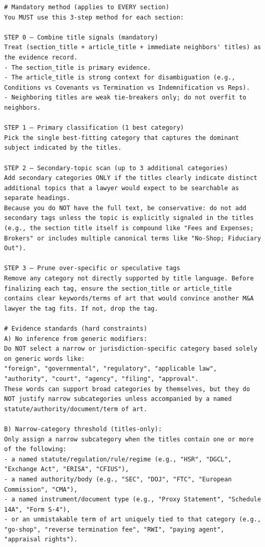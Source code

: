 \documentclass[12pt]{article}
\begin{document}
{\begin{appendices}
\begin{verbatim}
# Mandatory method (applies to EVERY section)
You MUST use this 3-step method for each section:

STEP 0 — Combine title signals (mandatory)
Treat (section_title + article_title + immediate neighbors' titles) as the evidence record.
- The section_title is primary evidence.
- The article_title is strong context for disambiguation (e.g., Conditions vs Covenants vs Termination vs Indemnification vs Reps).
- Neighboring titles are weak tie-breakers only; do not overfit to neighbors.

STEP 1 — Primary classification (1 best category)
Pick the single best-fitting category that captures the dominant subject indicated by the titles.

STEP 2 — Secondary-topic scan (up to 3 additional categories)
Add secondary categories ONLY if the titles clearly indicate distinct additional topics that a lawyer would expect to be searchable as separate headings.
Because you do NOT have the full text, be conservative: do not add secondary tags unless the topic is explicitly signaled in the titles
(e.g., the section title itself is compound like "Fees and Expenses; Brokers" or includes multiple canonical terms like "No-Shop; Fiduciary Out").

STEP 3 — Prune over-specific or speculative tags
Remove any category not directly supported by title language. Before finalizing each tag, ensure the section_title or article_title
contains clear keywords/terms of art that would convince another M&A lawyer the tag fits. If not, drop the tag.

# Evidence standards (hard constraints)
A) No inference from generic modifiers:
Do NOT select a narrow or jurisdiction-specific category based solely on generic words like:
"foreign", "governmental", "regulatory", "applicable law", "authority", "court", "agency", "filing", "approval".
These words can support broad categories by themselves, but they do NOT justify narrow subcategories unless accompanied by a named statute/authority/document/term of art.

B) Narrow-category threshold (titles-only):
Only assign a narrow subcategory when the titles contain one or more of the following:
- a named statute/regulation/rule/regime (e.g., "HSR", "DGCL", "Exchange Act", "ERISA", "CFIUS"),
- a named authority/body (e.g., "SEC", "DOJ", "FTC", "European Commission", "CMA"),
- a named instrument/document type (e.g., "Proxy Statement", "Schedule 14A", "Form S-4"),
- or an unmistakable term of art uniquely tied to that category (e.g., "go-shop", "reverse termination fee", "RWI", "paying agent", "appraisal rights").


\end{verbatim}
\end{appendices}}
\end{document}
